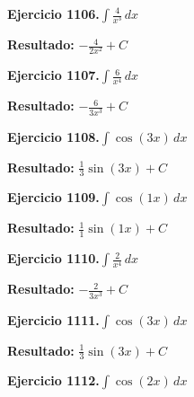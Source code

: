\documentclass[10pt,a4paper]{article}
\begin{document}
\begin{ejbox}
\textbf{Ejercicio 1106.}\quad $\int \frac{4}{x^{3}}\,dx$
\end{ejbox}

\begin{solbox}
\textbf{Resultado:} \(\displaystyle -\frac{4}{2x^{2}} + C\)
\end{solbox}

\begin{ejbox}
\textbf{Ejercicio 1107.}\quad $\int \frac{6}{x^{4}}\,dx$
\end{ejbox}

\begin{solbox}
\textbf{Resultado:} \(\displaystyle -\frac{6}{3x^{3}} + C\)
\end{solbox}

\newpage
\begin{ejbox}
\textbf{Ejercicio 1108.}\quad $\int \cos(3x)\,dx$
\end{ejbox}

\begin{solbox}
\textbf{Resultado:} \(\displaystyle \frac{1}{3}\sin(3x) + C\)
\end{solbox}

\begin{ejbox}
\textbf{Ejercicio 1109.}\quad $\int \cos(1x)\,dx$
\end{ejbox}

\begin{solbox}
\textbf{Resultado:} \(\displaystyle \frac{1}{1}\sin(1x) + C\)
\end{solbox}

\begin{ejbox}
\textbf{Ejercicio 1110.}\quad $\int \frac{2}{x^{4}}\,dx$
\end{ejbox}

\begin{solbox}
\textbf{Resultado:} \(\displaystyle -\frac{2}{3x^{3}} + C\)
\end{solbox}

\newpage
\begin{ejbox}
\textbf{Ejercicio 1111.}\quad $\int \cos(3x)\,dx$
\end{ejbox}

\begin{solbox}
\textbf{Resultado:} \(\displaystyle \frac{1}{3}\sin(3x) + C\)
\end{solbox}

\begin{ejbox}
\textbf{Ejercicio 1112.}\quad $\int \cos(2x)\,dx$
\end{ejbox}
\end{document}
